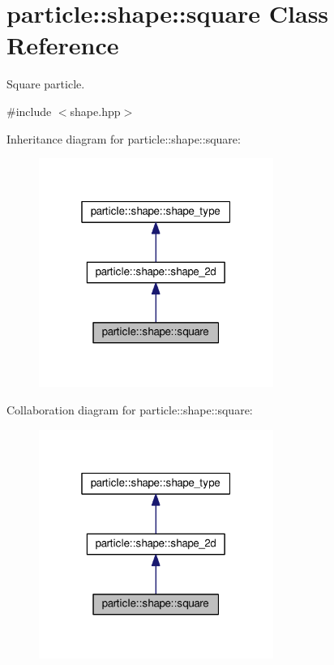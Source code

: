 \hypertarget{classparticle_1_1shape_1_1square}{}\section{particle\+:\+:shape\+:\+:square Class Reference}
\label{classparticle_1_1shape_1_1square}


Square particle.  




{\ttfamily \#include $<$shape.\+hpp$>$}



Inheritance diagram for particle\+:\+:shape\+:\+:square\+:\nopagebreak
\begin{figure}[H]
\begin{center}
\leavevmode
\includegraphics[width=217pt]{dd/d48/classparticle_1_1shape_1_1square__inherit__graph}
\end{center}
\end{figure}


Collaboration diagram for particle\+:\+:shape\+:\+:square\+:\nopagebreak
\begin{figure}[H]
\begin{center}
\leavevmode
\includegraphics[width=217pt]{dd/d79/classparticle_1_1shape_1_1square__coll__graph}
\end{center}
\end{figure}
